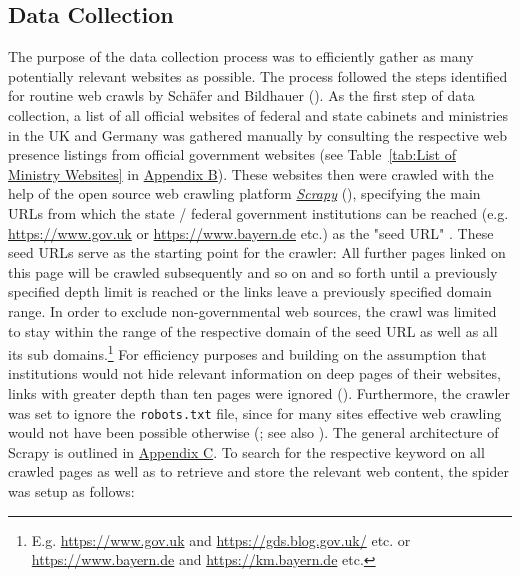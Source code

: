 \subsection{Data Collection}\label{Data Collection}
The purpose of the data collection process was to efficiently gather as many potentially relevant websites as possible. The process followed the steps identified for routine web crawls by Schäfer and Bildhauer (\cite*{Schafer2012}). As the first step of data collection, a list of all official websites of federal and state cabinets and ministries in the UK and Germany was gathered manually by consulting the respective web presence listings from official government websites (see Table~\ref{tab:List of Ministry Websites} in \hyperref[Appendix B]{Appendix B}). These websites then were crawled with the help of the open source web crawling platform \href{https://scrapy.org }{\textit{Scrapy}} (\cite{Kouzis-Loukas2016}), specifying the main URLs from which the state / federal government institutions can be reached (e.g. \url{https://www.gov.uk} or \url{https://www.bayern.de} etc.) as the "seed URL" \parencite[p. 115]{Barbaresi2015}. These seed URLs serve as the starting point for the crawler: All further pages linked on this page will be crawled subsequently and so on and so forth until a previously specified depth limit is reached or the links leave a previously specified domain range. In order to exclude non-governmental web sources, the crawl was limited to stay within the range of the respective domain of the seed URL as well as all its sub domains.\footnote{E.g. \url{https://www.gov.uk} and \url{https://gds.blog.gov.uk/} etc. or \url{https://www.bayern.de} and \url{https://km.bayern.de} etc.} For efficiency purposes and building on the assumption that institutions would not hide relevant information on deep pages of their websites, links with greater depth than ten pages were ignored (\cite{Scrapy2018, Wang2019}). Furthermore, the crawler was set to ignore the \texttt{robots.txt} file, since for many sites effective web crawling would not have been possible otherwise (\cite{Sun2007}; see also \cite[p. 125]{Barbaresi2015}). The general architecture of Scrapy is outlined in \hyperref[Appendix C]{Appendix C}. To search for the respective keyword on all crawled pages as well as to retrieve and store the relevant web content, the spider was setup as follows:
%
